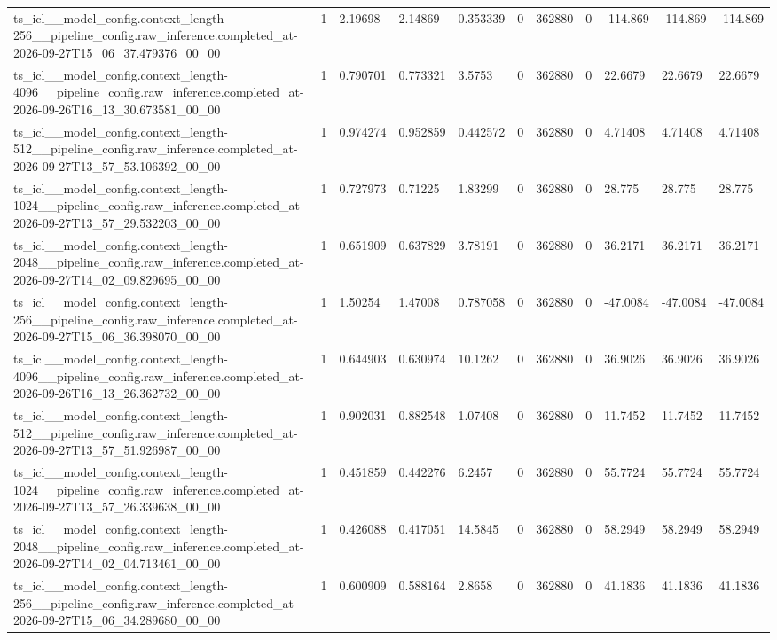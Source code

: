 \begin{tabular}{lllllllllll}
ts\_icl\_\_model\_config.context\_length-256\_\_pipeline\_config.raw\_inference.completed\_at-2026-09-27T15\_06\_37.479376\_00\_00 & 1 & 2.19698 & 2.14869 & 0.353339 & 0 & 362880 & 0 & -114.869 & -114.869 & -114.869 \\
ts\_icl\_\_model\_config.context\_length-4096\_\_pipeline\_config.raw\_inference.completed\_at-2026-09-26T16\_13\_30.673581\_00\_00 & 1 & 0.790701 & 0.773321 & 3.5753 & 0 & 362880 & 0 & 22.6679 & 22.6679 & 22.6679 \\
ts\_icl\_\_model\_config.context\_length-512\_\_pipeline\_config.raw\_inference.completed\_at-2026-09-27T13\_57\_53.106392\_00\_00 & 1 & 0.974274 & 0.952859 & 0.442572 & 0 & 362880 & 0 & 4.71408 & 4.71408 & 4.71408 \\
ts\_icl\_\_model\_config.context\_length-1024\_\_pipeline\_config.raw\_inference.completed\_at-2026-09-27T13\_57\_29.532203\_00\_00 & 1 & 0.727973 & 0.71225 & 1.83299 & 0 & 362880 & 0 & 28.775 & 28.775 & 28.775 \\
ts\_icl\_\_model\_config.context\_length-2048\_\_pipeline\_config.raw\_inference.completed\_at-2026-09-27T14\_02\_09.829695\_00\_00 & 1 & 0.651909 & 0.637829 & 3.78191 & 0 & 362880 & 0 & 36.2171 & 36.2171 & 36.2171 \\
ts\_icl\_\_model\_config.context\_length-256\_\_pipeline\_config.raw\_inference.completed\_at-2026-09-27T15\_06\_36.398070\_00\_00 & 1 & 1.50254 & 1.47008 & 0.787058 & 0 & 362880 & 0 & -47.0084 & -47.0084 & -47.0084 \\
ts\_icl\_\_model\_config.context\_length-4096\_\_pipeline\_config.raw\_inference.completed\_at-2026-09-26T16\_13\_26.362732\_00\_00 & 1 & 0.644903 & 0.630974 & 10.1262 & 0 & 362880 & 0 & 36.9026 & 36.9026 & 36.9026 \\
ts\_icl\_\_model\_config.context\_length-512\_\_pipeline\_config.raw\_inference.completed\_at-2026-09-27T13\_57\_51.926987\_00\_00 & 1 & 0.902031 & 0.882548 & 1.07408 & 0 & 362880 & 0 & 11.7452 & 11.7452 & 11.7452 \\
ts\_icl\_\_model\_config.context\_length-1024\_\_pipeline\_config.raw\_inference.completed\_at-2026-09-27T13\_57\_26.339638\_00\_00 & 1 & 0.451859 & 0.442276 & 6.2457 & 0 & 362880 & 0 & 55.7724 & 55.7724 & 55.7724 \\
ts\_icl\_\_model\_config.context\_length-2048\_\_pipeline\_config.raw\_inference.completed\_at-2026-09-27T14\_02\_04.713461\_00\_00 & 1 & 0.426088 & 0.417051 & 14.5845 & 0 & 362880 & 0 & 58.2949 & 58.2949 & 58.2949 \\
ts\_icl\_\_model\_config.context\_length-256\_\_pipeline\_config.raw\_inference.completed\_at-2026-09-27T15\_06\_34.289680\_00\_00 & 1 & 0.600909 & 0.588164 & 2.8658 & 0 & 362880 & 0 & 41.1836 & 41.1836 & 41.1836 \\

\end{tabular}

